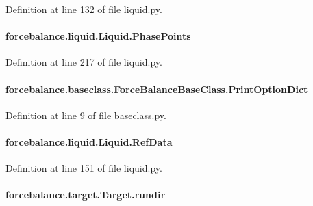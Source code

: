Definition at line 132 of file liquid.\-py.

\hypertarget{classforcebalance_1_1liquid_1_1Liquid_a2c10490d9073a069bd19361f386422ef}{
\paragraph[{Phase\-Points}]{\setlength{\rightskip}{0pt plus 5cm}forcebalance.\-liquid.\-Liquid.\-Phase\-Points}}\label{classforcebalance_1_1liquid_1_1Liquid_a2c10490d9073a069bd19361f386422ef}


Definition at line 217 of file liquid.\-py.

\hypertarget{classforcebalance_1_1baseclass_1_1ForceBalanceBaseClass_a5c55e661e746d1a4443f4e0bc34ebe05}{
\paragraph[{Print\-Option\-Dict}]{\setlength{\rightskip}{0pt plus 5cm}forcebalance.\-baseclass.\-Force\-Balance\-Base\-Class.\-Print\-Option\-Dict\hspace{0.3cm}{\ttfamily [inherited]}}}\label{classforcebalance_1_1baseclass_1_1ForceBalanceBaseClass_a5c55e661e746d1a4443f4e0bc34ebe05}


Definition at line 9 of file baseclass.\-py.

\hypertarget{classforcebalance_1_1liquid_1_1Liquid_a472f32bbaf18b8ead19b9156f305b8fc}{
\paragraph[{Ref\-Data}]{\setlength{\rightskip}{0pt plus 5cm}forcebalance.\-liquid.\-Liquid.\-Ref\-Data}}\label{classforcebalance_1_1liquid_1_1Liquid_a472f32bbaf18b8ead19b9156f305b8fc}


Definition at line 151 of file liquid.\-py.

\hypertarget{classforcebalance_1_1target_1_1Target_a6872de5b2d4273b82336ea5b0da29c9e}{
\paragraph[{rundir}]{\setlength{\rightskip}{0pt plus 5cm}forcebalance.\-target.\-Target.\-rundir\hspace{0.3cm}{\ttfamily [inherited]}}}\label{classforcebalance_1_1target_1_1Target_a6872de5b2d4273b82336ea5b0da29c9e}


